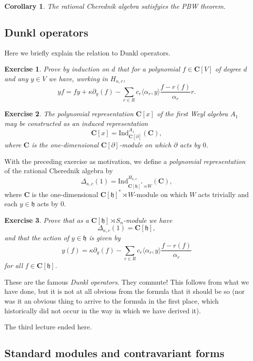 \documentclass[12pt, reqno]{amsart}
\numberwithin{equation}{section}
\theoremstyle{definition}
\theoremstyle{plain}
\newtheorem{corollary}[theorem]{Corollary}
\newtheorem{exercise}{Exercise}
\newcommand{\CC}{\mathbf{C}}
\newcommand{\hh}{\mathfrak{h}}
\newcommand{\la}{\langle}
\newcommand{\ra}{\rangle}
\begin{document}
\begin{corollary}
The rational Cherednik algebra satisfyies the PBW theorem.	
\end{corollary}

\subsection{Dunkl operators}

Here we briefly explain the relation to Dunkl operators. 
\begin{exercise}
Prove by induction on $d$ that for a polynomial $f \in \CC[V]$ of degree $d$ and any $y \in V$ we have, working in $H_{\kappa,c}$,
$$yf=fy+\kappa \partial_y(f)-\sum_{r \in R} c_r \la \alpha_r, y \ra \frac{f-r(f)}{\alpha_r} r.$$
\end{exercise}

\begin{exercise} The polynomial representation $\CC[x]$ of the first Weyl algebra $A_1$ may be constructed as an induced representation
$$\CC[x]=\mathrm{Ind}_{\CC[\partial]}^{A_1}(\CC),$$ where $\CC$ is the one-dimensional $\CC[\partial]$-module on which $\partial$ acts by $0$.
\end{exercise}

With the preceding exercise as motivation, we define a \emph{polynomial representation} of the rational Cherednik algebra by
$$\Delta_{\kappa,c}(1)=\mathrm{Ind}_{\CC[\hh]^* \rtimes W}^{H_{\kappa,c}}(\CC),$$ where $\CC$ is the one-dimensional $\CC[\hh]^* \rtimes W$-module on which $W$ acts trivially and each $y \in \hh$ acts by $0$.
\begin{exercise}
Prove that as a $\CC[\hh] \rtimes S_n$-module we have
$$\Delta_{\kappa,c}(1)=\CC[\hh],$$ and that the action of $y \in \hh$ is given by
$$y(f)=\kappa \partial_y(f)-\sum_{r \in R} c_r \la \alpha_r,y \ra \frac{f-r(f)}{\alpha_r}$$ for all $f \in \CC[\hh]$. 
\end{exercise} These are the famous \emph{Dunkl operators}. They commute! This follows from what we have done, but it is not at all obvious from the formula that it should be so (nor was it an obvious thing to arrive to the formula in the first place, which historically did not occur in the way in which we have derived it).

The third lecture ended here.

\subsection{Standard modules and contravariant forms}
\end{document}
